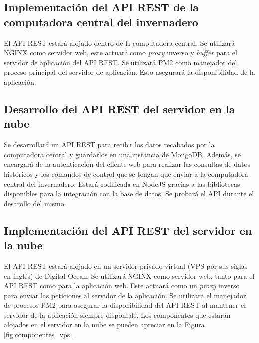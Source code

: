 \subsection{Implementación del API REST de la computadora central del invernadero}
El API REST estará alojado dentro de la computadora central. Se utilizará NGINX como servidor web, este actuará como \textit{proxy} inverso y \textit{buffer} para el servidor de aplicación del API REST. Se utilizará PM2 como manejador del proceso principal del servidor de aplicación. Esto asegurará la disponibilidad de la aplicación. 

\subsection{Desarrollo del API REST del servidor en la nube}
Se desarrollará un API REST para recibir los datos recabados por la computadora central y guardarlos en una instancia de MongoDB. Además, se encargará de la autenticación del cliente web para realizar las consultas de datos históricos y los comandos de control que se tengan que enviar a la computadora central del invernadero. Estará codificada en NodeJS gracias a las bibliotecas disponibles para la integración con la base de datos. Se probará el API durante el desarollo del mismo.

\subsection{Implementación del API REST del servidor en la nube}
El API REST estará alojado en un servidor privado virtual (VPS por sus siglas en inglés) de Digital Ocean. Se utilizará NGINX como servidor web, tanto para el API REST como para la aplicación web. Este actuará como un \textit{proxy} inverso para enviar las peticiones al servidor de la aplicación. Se utilizará el manejador de procesos PM2 para asegurar la disponibilidad del API REST al mantener el servidor de la aplicación siempre disponible. Los componentes que estarán alojados en el servidor en la nube se pueden apreciar en la Figura \ref{fig:componentes_vps}.

